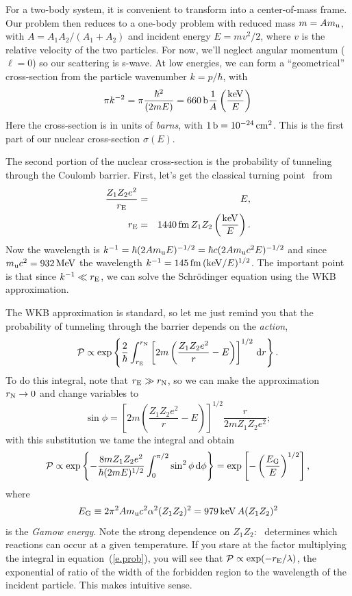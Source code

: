 For a two-body system, it is convenient to transform into a center-of-mass frame.  Our problem then reduces to a one-body problem with reduced mass $m = Am_\mathrm{u}$, with $A=A_{1}A_{2}/(A_{1}+A_{2})$ and incident energy $E = m v^{2}/2$, where $v$ is the relative velocity of the two particles.  For now, we'll neglect angular momentum ($\ell = 0$) so our scattering is s-wave.
At low energies, we can form a ``geometrical'' cross-section from the particle wavenumber $k = p/\hbar$, with
\begin{equation}\label{e.geo}
\pi k^{-2} = \pi\frac{\hbar^{2}}{(2mE)} = 660\,\mathrm{b}\frac{1}{A}\left(\frac{\mathrm{k}\mathrm{eV}}{E}\right)
\end{equation}
Here the cross-section is in units of \emph{barns}, with $1\,\mathrm{b} = 10^{-24}\,\mathrm{c}\mathrm{m}^{2}$.  This is the first part of our nuclear cross-section $\sigma(E)$. 

The second portion of the nuclear cross-section is the probability of tunneling through the Coulomb barrier.  First, let's get the classical turning point \re\ from
\begin{eqnarray}
\frac{Z_{1}Z_{2}e^{2}}{r_{\mathrm{E}}} &=& E,\nonumber\\
r_{\mathrm{E}} &=& 1440\,\mathrm{fm}\, Z_{1}Z_{2}\left(\frac{\mathrm{k}\mathrm{eV}}{E}\right).
\end{eqnarray}
Now the wavelength is $k^{-1} = \hbar(2Am_\mathrm{u} E)^{-1/2} = \hbar c (2Am_\mathrm{u} c^{2} E)^{-1/2}$ and since $m_\mathrm{u} c^{2} = 932\,\mathrm{M}\mathrm{eV}$ the wavelength $k^{-1} = 145\,\mathrm{fm}\,(\mathrm{k}\mathrm{eV}/E)^{1/2}$. The important point is that since $k^{-1}\ll r_{\mathrm{E}}$, we can solve the Schr\"odinger equation using the WKB approximation.

The WKB approximation is standard, so let me just remind you that the probability of tunneling through the barrier depends on the \emph{action},
\begin{equation}\label{e.wkb}
\mathcal{P} \propto \exp\left\{\frac{2}{\hbar}\int_{r_{\mathrm{E}}}^{r_{\mathrm{N}}}\left[2m\left(\frac{Z_{1}Z_{2}e^{2}}{r}-E\right) \right]^{1/2}\,\mathrm{d} r\right\}.
\end{equation}
To do this integral, note that $r_{\mathrm{E}}\gg r_{\mathrm{N}}$, so we can make the approximation $r_{\mathrm{N}}\to 0$ and change variables to
\[
\sin\phi = \left[2m\left(\frac{Z_{1}Z_{2}e^{2}}{r}-E\right) \right]^{1/2}\frac{r}{2mZ_{1}Z_{2}e^{2}};
\]
with this substitution we tame the integral and obtain
\begin{equation}\label{e.prob}
\mathcal{P} \propto \exp\left\{-\frac{8mZ_{1}Z_{2}e^{2}}{\hbar(2mE)^{1/2}}\int_{0}^{\pi/2}\sin^{2}\phi\,\mathrm{d}\phi\right\} = \exp\left[-\left(\frac{E_{\mathrm{G}}}{E}\right)^{1/2}\right],
\end{equation}
where
\begin{equation}\label{e.EGamow}
E_{\mathrm{G}}\equiv 2\pi^{2} A m_\mathrm{u} c^{2} \alpha^{2} (Z_{1}Z_{2})^{2} = 979\,\mathrm{k}\mathrm{eV} \, A (Z_{1}Z_{2})^{2}
\end{equation}
is the \emph{Gamow energy}.  Note the strong dependence on $Z_{1}Z_{2}$: \EG\ determines which reactions can occur at a given temperature. If you stare at the factor multiplying the integral in equation~(\ref{e.prob}), you will see that $\mathcal{P}\propto \exp(-r_{\mathrm{E}}/\lambda)$, the exponential of ratio of the width of the forbidden region to the wavelength of the incident particle. This makes intuitive sense.

